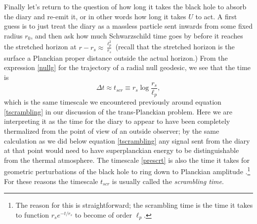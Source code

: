 \documentclass[12pt]{article}
\newcommand{\be}{\begin{equation}}
\newcommand{\ee}{\end{equation}}
\begin{document}
Finally let's return to the question of how long it takes the black hole to absorb the diary and re-emit it, or in other words how long it takes $U$ to act.  A first guess is to just treat the diary as a massless particle sent inwards from some fixed radius $r_0$, and then ask how much Schwarzschild time goes by before it reaches the stretched horizon at $r-r_s\approx \frac{\ell_p^2}{r_s}$ (recall that the stretched horizon is the surface a Planckian proper distance outside the actual horizon.)  From the expression \eqref{nullg} for the trajectory of a radial null geodesic, we see that the time is
\be\label{prescrt}
\Delta t \approx t_{scr}\equiv r_s\log \frac{r_s}{\ell_p},
\ee
which is the same timescale we encountered previously around equation \eqref{tscrambling} in our discussion of the trans-Planckian problem.  Here we are interpreting it as the time for the diary to appear to have been completely thermalized from the point of view of an outside observer; by the same calculation as we did below equation \eqref{tscrambling} any signal sent from the diary at that point would need to have superplanckian energy to be distinguishable from the thermal atmosphere.  The timescale \eqref{prescrt} is also the time it takes for geometric perturbations of the black hole to ring down to Planckian amplitude \cite{Price:1986yy}.\footnote{The reason for this is straightforward; the scrambling time is the time it takes to function $r_s e^{-t/r_s}$ to become of order $\ell_p$.}  For these reasons the timescale $t_{scr}$ is usually called the \textit{scrambling time}.  
\end{document}
